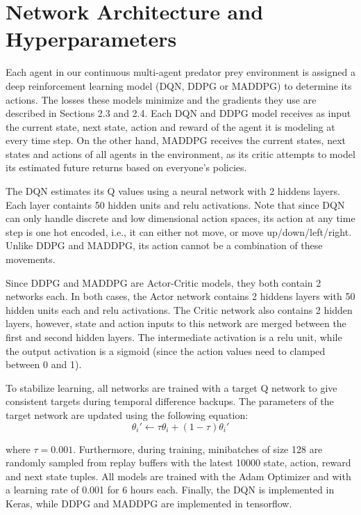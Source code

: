 
\section{Network Architecture and Hyperparameters}

Each agent in our continuous multi-agent predator prey environment is assigned a deep reinforcement learning model (DQN, DDPG or MADDPG) to determine its actions. The losses these models minimize and the gradients they use are described in Sections 2.3 and 2.4. Each DQN and DDPG model receives as input the current state, next state, action and reward of the agent it is modeling at every time step. On the other hand, MADDPG receives the current states, next states and actions of all agents in the environment, as its critic attempts to model its estimated future returns based on everyone's policies.  

The DQN estimates its Q values using a neural network with 2 hiddens layers. Each layer containts 50 hidden units and relu activations. Note that since DQN can only handle discrete and low dimensional action spaces, its action at any time step is one hot encoded, i.e., it can either not move, or move up/down/left/right. Unlike DDPG and MADDPG, its action cannot be a combination of these movements. 

Since DDPG and MADDPG are Actor-Critic models, they both contain 2 networks each. In both cases, the Actor network contains 2 hiddens layers with 50 hidden units each and relu activations. The Critic network also contains 2 hidden layers, however, state and action inputs to this network are merged between the first and second hidden layers. The intermediate activation is a relu unit, while the output activation is a sigmoid (since the action values need to clamped between 0 and 1). 

To stabilize learning, all networks are trained with a target Q network to give consistent targets during temporal difference backups. The parameters of the target network are updated using the following equation:
\begin{equation}
\theta_{i}' \leftarrow \tau\theta_{i} + (1 - \tau)\theta_{i}'
\end{equation}

where $\tau = 0.001$. Furthermore, during training, minibatches of size 128 are randomly sampled from replay buffers with the latest 10000 state, action, reward and next state tuples. All models are trained with the Adam Optimizer and with a learning rate of 0.001 for 6 hours each. Finally, the DQN is implemented in Keras, while DDPG and MADDPG are implemented in tensorflow. 

